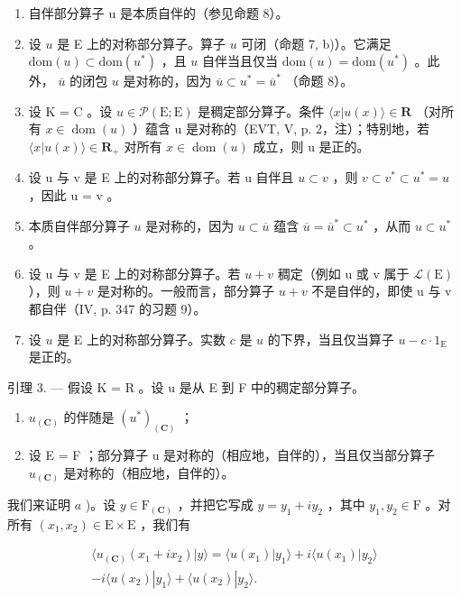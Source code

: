 \begin{enumerate}
\def\labelenumi{\arabic{enumi})}
\setcounter{enumi}{1}
\item
  自伴部分算子 u 是本质自伴的（参见命题 8）。
\item
  设 \(u\) 是 E 上的对称部分算子。算子 \(u\) 可闭（命题 7, b)）。它满足 \(\text{dom}(u) \subset \text{dom}(u^*)\) ，且 \(u\) 自伴当且仅当 \(\text{dom}(u) = \text{dom}(u^*)\) 。此外， \(\overline{u}\) 的闭包 \(u\) 是对称的，因为 \(\overline{u} \subset u^* = \overline{u}^*\) （命题 8）。
\item
  设 K = C 。设 \(u \in \mathcal{P}(\mathrm{E};\mathrm{E})\) 是稠定部分算子。条件 \(\langle x | u(x) \rangle \in \mathbf{R}\) （对所有 \(x \in \operatorname{dom}(u)\) ）蕴含 u 是对称的（EVT, V, p. 2，注）；特别地，若 \(\langle x | u(x) \rangle \in \mathbf{R}_{+}\) 对所有 \(x \in \operatorname{dom}(u)\) 成立，则 u 是正的。
\item
  设 u 与 v 是 E 上的对称部分算子。若 u 自伴且 \(u \subset v\) ，则 \(v \subset v^{*} \subset u^{*} = u\) ，因此 u = v 。
\item
  本质自伴部分算子 \(u\) 是对称的，因为 \(u \subset \overline{u}\) 蕴含 \(\overline{u} = \overline{u}^{*} \subset u^{*}\) ，从而 \(u \subset u^{*}\) 。
\item
  设 u 与 v 是 E 上的对称部分算子。若 \(u+v\) 稠定（例如 u 或 v 属于 \(\mathcal{L}(\mathrm{E})\) ），则 \(u+v\) 是对称的。一般而言，部分算子 \(u + v\) 不是自伴的，即使 u 与 v 都自伴（IV, p. 347 的习题 9）。
\item
  设 \(u\) 是 E 上的对称部分算子。实数 \(c\) 是 \(u\) 的下界，当且仅当算子 \(u - c \cdot 1_{\mathrm{E}}\) 是正的。
\end{enumerate}

引理 3. --- 假设 K = R 。设 u 是从 E 到 F 中的稠定部分算子。

\begin{enumerate}
\def\labelenumi{\alph{enumi})}
\item
\(u_{(\mathbf C)}\) 的伴随是 \((u^*)_{(\mathbf C)}\) ；
\item
  设 E = F ；部分算子 u 是对称的（相应地，自伴的），当且仅当部分算子 \(u_{(\mathbf{C})}\) 是对称的（相应地，自伴的）。
\end{enumerate}

我们来证明 \(a\) )。设 \(y \in \mathrm{F}_{(\mathbf{C})}\) ，并把它写成 \(y = y_1 + iy_2\) ，其中 \(y_1, y_2 \in \mathrm{F}\) 。对所有 \((x_1, x_2) \in \mathrm{E} \times \mathrm{E}\) ，我们有

\[
\begin{array}{c} \langle u _ {(\mathbf {C})} (x _ {1} + i x _ {2})   |   y \rangle = \langle u (x _ {1})   |   y _ {1} \rangle + i \langle u (x _ {1})   |   y _ {2} \rangle \\ - i \langle u (x _ {2})   |   y _ {1} \rangle + \langle u (x _ {2})   |   y _ {2} \rangle . \end{array}
\]

